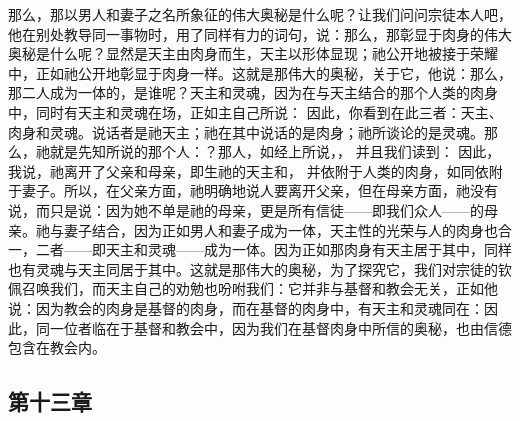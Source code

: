 \par

那么，那以男人和妻子之名所象征的伟大奥秘是什么呢？让我们问问宗徒本人吧，他在别处教导同一事物时，用了同样有力的词句，说：那么，那彰显于肉身的伟大奥秘是什么呢？显然是天主由肉身而生，天主以形体显现；祂公开地被接于荣耀中，正如祂公开地彰显于肉身一样。这就是那伟大的奥秘，关于它，他说：那么，那二人成为一体的，是谁呢？天主和灵魂，因为在与天主结合的那个人类的肉身中，同时有天主和灵魂在场，正如主自己所说：  因此，你看到在此三者：天主、肉身和灵魂。说话者是祂天主；祂在其中说话的是肉身；祂所谈论的是灵魂。那么，祂就是先知所说的那个人：？那人，如经上所说，， 并且我们读到：  因此，我说，祂离开了父亲和母亲，即生祂的天主和， 并依附于人类的肉身，如同依附于妻子。所以，在父亲方面，祂明确地说人要离开父亲，但在母亲方面，祂没有说，而只是说：因为她不单是祂的母亲，更是所有信徒——即我们众人——的母亲。祂与妻子结合，因为正如男人和妻子成为一体，天主性的光荣与人的肉身也合一，二者——即天主和灵魂——成为一体。因为正如那肉身有天主居于其中，同样也有灵魂与天主同居于其中。这就是那伟大的奥秘，为了探究它，我们对宗徒的钦佩召唤我们，而天主自己的劝勉也吩咐我们：它并非与基督和教会无关，正如他说：因为教会的肉身是基督的肉身，而在基督的肉身中，有天主和灵魂同在：因此，同一位者临在于基督和教会中，因为我们在基督肉身中所信的奥秘，也由信德包含在教会内。\par


\subsection{第十三章}

\par

